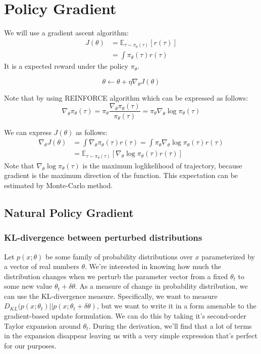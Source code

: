 \chapter{Policy Gradient}
We will use a gradient ascent algorithm:
\begin{align*}
	J(\theta) &=  \mathbb{E}_{\tau\sim \pi_\theta(\tau)}[r(\tau)]\\
	&= \int \pi_\theta(\tau) r(\tau)
	\label{eq:cost_fn}
\end{align*}
It is a expected reward under the policy $\pi_\theta$.

$$\theta \leftarrow \theta + \eta \nabla_\theta J(\theta)$$

Note that by using REINFORCE algorithm which can be expressed as follows:
$$\nabla_\theta \pi_\theta(\tau) = \pi_\theta \frac{\nabla_\theta \pi_\theta(\tau)}{\pi_\theta(\tau)} = \pi_\theta \nabla_\theta \log \pi_\theta(\tau)$$

We can express $J(\theta)$ as follows:
\begin{align*}
    \nabla_\theta J(\theta) &= \int \nabla_\theta\pi_\theta(\tau) r(\tau) = \int \pi_\theta \nabla_\theta \log \pi_\theta(\tau)r(\tau)\\
	&= \mathbb{E}_{\tau\sim \pi_\theta(\tau)}[\nabla_\theta \log \pi_\theta(\tau)r(\tau)] 
\end{align*}
Note that $\nabla_\theta \log \pi_\theta(\tau)$ is the maximum loglikelihood of trajectory, because gradient is the maximum direction of the function. This expectation can be estimated by Monte-Carlo method. 

\section{Natural Policy Gradient}
\subsection{KL-divergence between perturbed distributions}
Let $p(x; \theta)$ be some family of probability distributions over $x$ parameterized by a vector of real numbers $\theta$. We're interested in knowing how much the distribution changes when we perturb the parameter vector from a fixed $\theta_t$ to some new value $\theta_t+\delta \theta$. As a measure of change in probability distribution, we can use the KL-divergence measure. Specifically, we want to measure $D_{KL}(p(x;\theta_t)|| p(x;\theta_t+\delta \theta)$, but we want to write it in a form amenable to the gradient-based update formulation. We can do this by taking it's second-order Taylor expansion around $\theta_t$. During the derivation, we'll find that a lot of terms in the expansion disappear leaving us with a very simple expression that's perfect for our purposes. 

